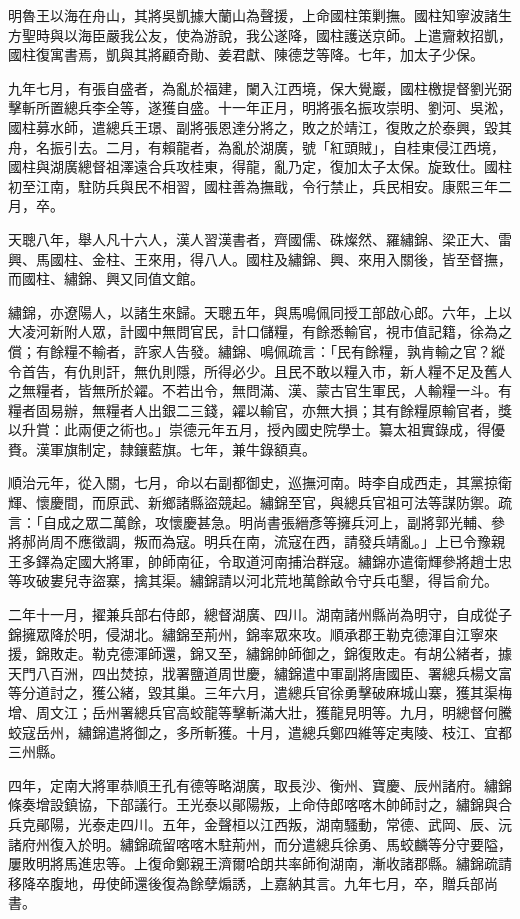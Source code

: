 \begin{pinyinscope}
明魯王以海在舟山，其將吳凱據大蘭山為聲援，上命國柱策剿撫。國柱知寧波諸生方聖時與以海臣嚴我公友，使為游說，我公遂降，國柱護送京師。上遣齎敕招凱，國柱復寓書焉，凱與其將顧奇勛、姜君獻、陳德芝等降。七年，加太子少保。

九年七月，有張自盛者，為亂於福建，闌入江西境，保大覺巖，國柱檄提督劉光弼擊斬所置總兵李全等，遂獲自盛。十一年正月，明將張名振攻崇明、劉河、吳淞，國柱募水師，遣總兵王璟、副將張恩達分將之，敗之於靖江，復敗之於泰興，毀其舟，名振引去。二月，有賴龍者，為亂於湖廣，號「紅頭賊」，自桂東侵江西境，國柱與湖廣總督祖澤遠合兵攻桂東，得龍，亂乃定，復加太子太保。旋致仕。國柱初至江南，駐防兵與民不相習，國柱善為撫戢，令行禁止，兵民相安。康熙三年二月，卒。

天聰八年，舉人凡十六人，漢人習漢書者，齊國儒、硃燦然、羅繡錦、梁正大、雷興、馬國柱、金柱、王來用，得八人。國柱及繡錦、興、來用入關後，皆至督撫，而國柱、繡錦、興又同值文館。

繡錦，亦遼陽人，以諸生來歸。天聰五年，與馬鳴佩同授工部啟心郎。六年，上以大凌河新附人眾，計國中無問官民，計口儲糧，有餘悉輸官，視市值記籍，徐為之償；有餘糧不輸者，許家人告發。繡錦、鳴佩疏言：「民有餘糧，孰肯輸之官？縱令首告，有仇則訐，無仇則隱，所得必少。且民不敢以糧入市，新人糧不足及舊人之無糧者，皆無所於糴。不若出令，無問滿、漢、蒙古官生軍民，人輸糧一斗。有糧者固易辦，無糧者人出銀二三錢，糴以輸官，亦無大損；其有餘糧原輸官者，獎以升賞：此兩便之術也。」崇德元年五月，授內國史院學士。纂太祖實錄成，得優賚。漢軍旗制定，隸鑲藍旗。七年，兼牛錄額真。

順治元年，從入關，七月，命以右副都御史，巡撫河南。時李自成西走，其黨掠衛輝、懷慶間，而原武、新鄉諸縣盜競起。繡錦至官，與總兵官祖可法等謀防禦。疏言：「自成之眾二萬餘，攻懷慶甚急。明尚書張縉彥等擁兵河上，副將郭光輔、參將郝尚周不應徵調，叛而為寇。明兵在南，流寇在西，請發兵靖亂。」上已令豫親王多鐸為定國大將軍，帥師南征，令取道河南捕治群寇。繡錦亦遣衛輝參將趙士忠等攻破婁兒寺盜寨，擒其渠。繡錦請以河北荒地萬餘畝令守兵屯墾，得旨俞允。

二年十一月，擢兼兵部右侍郎，總督湖廣、四川。湖南諸州縣尚為明守，自成從子錦擁眾降於明，侵湖北。繡錦至荊州，錦率眾來攻。順承郡王勒克德渾自江寧來援，錦敗走。勒克德渾師還，錦又至，繡錦帥師御之，錦復敗走。有胡公緒者，據天門八百洲，四出焚掠，戕署鹽道周世慶，繡錦遣中軍副將唐國臣、署總兵楊文富等分道討之，獲公緒，毀其巢。三年六月，遣總兵官徐勇擊破麻城山寨，獲其渠梅增、周文江；岳州署總兵官高蛟龍等擊斬滿大壯，獲龍見明等。九月，明總督何騰蛟寇岳州，繡錦遣將御之，多所斬獲。十月，遣總兵鄭四維等定夷陵、枝江、宜都三州縣。

四年，定南大將軍恭順王孔有德等略湖廣，取長沙、衡州、寶慶、辰州諸府。繡錦條奏增設鎮協，下部議行。王光泰以鄖陽叛，上命侍郎喀喀木帥師討之，繡錦與合兵克鄖陽，光泰走四川。五年，金聲桓以江西叛，湖南騷動，常德、武岡、辰、沅諸府州復入於明。繡錦疏留喀喀木駐荊州，而分遣總兵徐勇、馬蛟麟等分守要隘，屢敗明將馬進忠等。上復命鄭親王濟爾哈朗共率師徇湖南，漸收諸郡縣。繡錦疏請移降卒腹地，毋使師還後復為餘孽煽誘，上嘉納其言。九年七月，卒，贈兵部尚書。


\end{pinyinscope}
